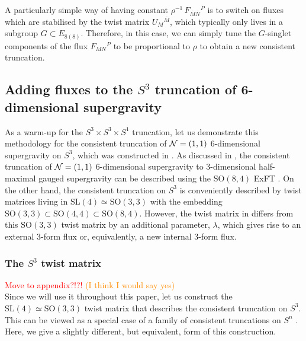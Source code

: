 \documentclass[a4paper, 11pt]{article}
\numberwithin{equation}{section}
\newcommand{\ov}[1]{\overline{#1}}
\newcommand{\SL}[1]{\mathrm{SL}( #1 )}
\newcommand{\SO}[1]{\mathrm{SO}( #1 )}
\newcommand{\EE}{\ensuremath{E_{8(8)}}\xspace}
\newcommand{\+}{\oplus}
\newcommand{\fl}[1]{\ov{#1}}
\newcommand{\EM}[1]{\textcolor{red}{#1}}
\newcommand{\CE}[1]{\textcolor{darkorange}{#1}}
\begin{document}
A particularly simple way of having constant $\rho^{-1}\, F_{\fl{M}\fl{N}}{}^{\fl{P}}$ is to switch on fluxes which are stabilised by the twist matrix $U_M{}^{\fl{M}}$, which typically only lives in a subgroup $G \subset \EE$. Therefore, in this case, we can simply tune the $G$-singlet components of the flux $F_{MN}{}^P$ to be proportional to $\rho$ to obtain a new consistent truncation.

\subsection{Adding fluxes to the $S^3$ truncation of 6-dimensional supergravity} \label{s:S3Flux}
As a warm-up for the $S^3 \times S^3 \times S^1$ truncation, let us demonstrate this methodology for the consistent truncation of ${\cal N}=(1,1)$ 6-dimensional supergravity on $S^3$, which was constructed in \cite{Eloy:2021fhc}. As discussed in \cite{Eloy:2021fhc}, the consistent truncation of ${\cal N}=(1,1)$ 6-dimensional supergravity to 3-dimensional half-maximal gauged supergravity can be described using the $\SO{8,4}$ ExFT \cite{Hohm:2017wtr,Samtleben:2019zrh}. On the other hand, the consistent truncation on $S^3$ is conveniently described by twist matrices living in $\SL{4} \simeq \SO{3,3}$ \cite{Lee:2014mla,Hohm:2014qga,Baguet:2015iou} with the embedding $\SO{3,3} \subset \SO{4,4} \subset \SO{8,4}$. However, the twist matrix in \cite{Eloy:2021fhc} differs from this $\SO{3,3}$ twist matrix \cite{Lee:2014mla,Hohm:2014qga,Baguet:2015iou} by an additional parameter, $\lambda$, which gives rise to an external 3-form flux or, equivalently, a new internal 3-form flux.

\subsubsection{The $S^3$ twist matrix}
\EM{Move to appendix?!?!} \CE{(I think I would say yes)}\\
Since we will use it throughout this paper, let us construct the $\SL{4} \simeq \SO{3,3}$ twist matrix that describes the consistent truncation on $S^3$. This can be viewed as a special case of a family of consistent truncations on $S^n$ \cite{Lee:2014mla,Hohm:2014qga,Baguet:2015iou}. Here, we give a slightly different, but equivalent, form of this construction.
\end{document}
